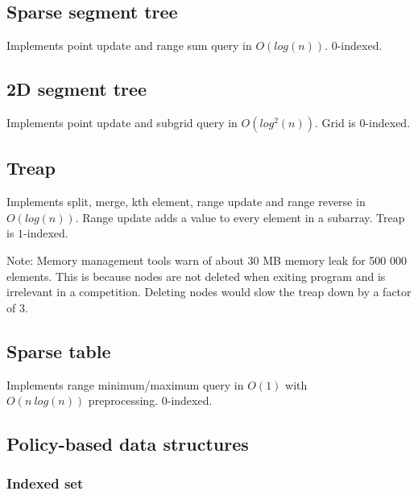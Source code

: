 \documentclass{article}
\begin{document}
\subsection {Sparse segment tree}

Implements point update and range sum query in $O(log(n))$. $0$-indexed.



\subsection {2D segment tree}

Implements point update and subgrid query in $O(log^2(n))$. Grid is $0$-indexed.



\subsection {Treap}

Implements split, merge, kth element, range update and range reverse in $O(log(n))$. Range update adds a value to every element in a subarray. Treap is $1$-indexed.

Note: Memory management tools warn of about 30 MB memory leak for 500 000 elements. This is because nodes are not deleted when exiting program and is irrelevant in a competition. Deleting nodes would slow the treap down by a factor of 3.



\subsection {Sparse table}

Implements range minimum/maximum query in $O(1)$ with \\ $O(n \ log(n))$ preprocessing. $0$-indexed.



\subsection {Policy-based data structures}

\subsubsection {Indexed set}
\end{document}
